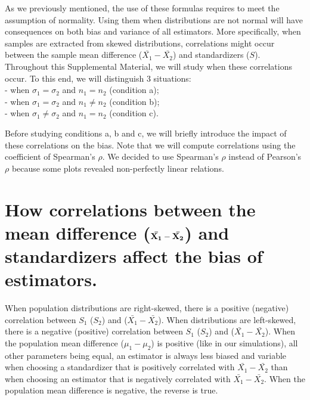 \documentclass[
  english,
  man,mask]{apa6}
\begin{document}
As we previously mentioned, the use of these formulas requires to meet the assumption of normality. Using them when distributions are not normal will have consequences on both bias and variance of all estimators. More specifically, when samples are extracted from skewed distributions, correlations might occur between the sample mean difference (\(\bar{X_1}-\bar{X_2}\)) and standardizers (\(S\)). Throughout this Supplemental Material, we will study when these correlations occur. To this end, we will distinguish 3 situations:\\
- when \(\sigma_1=\sigma_2\) and \(n_1=n_2\) (condition a);\\
- when \(\sigma_1=\sigma_2\) and \(n_1\neq n_2\) (condition b);\\
- when \(\sigma_1 \neq \sigma_2\) and \(n_1 = n_2\) (condition c).

Before studying conditions a, b and c, we will briefly introduce the impact of these correlations on the bias. Note that we will compute correlations using the coefficient of Spearman's \(\rho\). We decided to use Spearman's \(\rho\) instead of Pearson's \(\rho\) because some plots revealed non-perfectly linear relations.

\hypertarget{how-correlations-between-the-mean-difference-bf-barx_1-barx_2-and-standardizers-affect-the-bias-of-estimators.}{%
\section{\texorpdfstring{How correlations between the mean difference (\(\bf \bar{X_1}-\bar{X_2}\)) and standardizers affect the bias of estimators.}{How correlations between the mean difference (\textbackslash bf \textbackslash bar\{X\_1\}-\textbackslash bar\{X\_2\}) and standardizers affect the bias of estimators.}}\label{how-correlations-between-the-mean-difference-bf-barx_1-barx_2-and-standardizers-affect-the-bias-of-estimators.}}

When population distributions are right-skewed, there is a positive (negative) correlation between \(S_1\) (\(S_2\)) and (\(\bar{X_1}-\bar{X_2}\)). When distributions are left-skewed, there is a negative (positive) correlation between \(S_1\) (\(S_2\)) and (\(\bar{X_1}-\bar{X_2}\)). When the population mean difference (\(\mu_1-\mu_2\)) is positive (like in our simulations), all other parameters being equal, an estimator is always less biased and variable when choosing a standardizer that is positively correlated with \(\bar{X_1}-\bar{X_2}\) than when choosing an estimator that is negatively correlated with \(\bar{X_1}-\bar{X_2}\). When the population mean difference is negative, the reverse is true.
\end{document}
